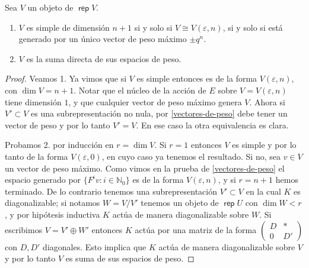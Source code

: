 \documentclass[11pt,fleqn]{article}
\newcommand\NN{\mathbb N}
\DeclareMathOperator\rep{\mathsf{rep}}
\begin{document}
\begin{Lemma*}
Sea $V$ un objeto de $\rep V$.
\begin{enumerate}
\item $V$ es simple de dimensión $n+1$ si y solo si $V \cong V(\varepsilon, n)$, si y 
solo si está generado por un único vector de peso máximo $\pm q^n$. 
\item $V$ es la suma directa de sus espacios de peso.
\end{enumerate}
\end{Lemma*}
\begin{proof}
Veamos 1. Ya vimos que si $V$ es simple entonces es de la forma $V(\varepsilon, n)$, con 
$\dim V = n+1$. Notar que el núcleo de la acción de $E$ sobre $V = V(\varepsilon, n)$ 
tiene dimensión $1$, y que cualquier vector de peso máximo genera $V$. Ahora si $V' 
\subset V$ es una subrepresentación no nula, por \ref{vectores-de-peso} debe tener un 
vector de peso y por lo tanto $V' = V$. En ese caso la otra equivalencia es clara.

Probamos 2. por inducción en $r = \dim V$. Si $r = 1$ entonces $V$ es simple y
por lo tanto de la forma $V(\varepsilon, 0)$, en cuyo caso ya tenemos el resultado. 
Si no, sea $v \in V$ un vector de peso máximo. Como vimos en la prueba de 
\ref{vectores-de-peso} el espacio generado por $\{F^iv : i \in \NN_0\}$ es de la forma 
$V(\varepsilon, n)$, y si $r = n+1$ hemos terminado. De lo contrario tenemos una 
subrepresentación $V' \subset V$ en la cual $K$ es diagonalizable; si notamos $W = V/V'$ 
tenemos un objeto de $\rep U$ con $\dim W < r$, y por hipótesis inductiva $K$ actúa de 
manera diagonalizable sobre $W$. Si escribimos $V = V' \oplus W'$ entonces $K$ actúa por 
una matriz de la forma $\begin{pmatrix} D & * \\ 0 & D'\end{pmatrix}$ con $D, D'$ 
diagonales. Esto implica que $K$ actúa de manera diagonalizable sobre $V$ y por lo tanto 
$V$ es suma de sus espacios de peso.
\end{proof}
\end{document}
